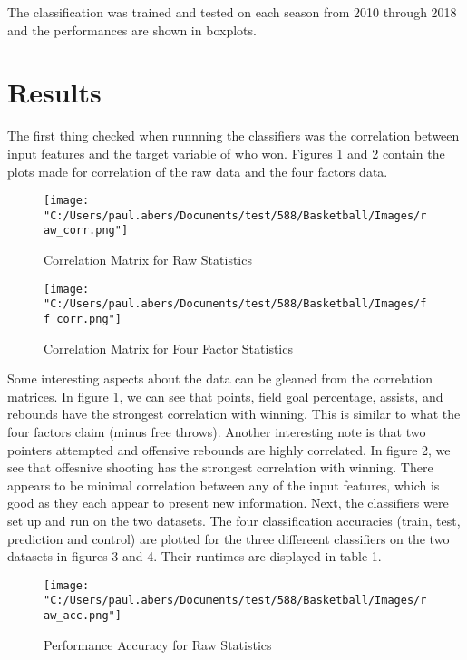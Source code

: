 \documentclass[12pt]{article}%
\begin{document}
\newline\newline
The classification was trained and tested on each season from 2010 through 2018 and the performances are shown in boxplots.
\section{Results}
The first thing checked when runnning the classifiers was the correlation between input features and the target variable of who won. Figures 1 and 2 contain the plots made for correlation of the raw data and the four factors data.


\begin{figure}[H]
\caption{Correlation Matrix for Raw Statistics}
\centering
\texttt{[image: "C:/Users/paul.abers/Documents/test/588/Basketball/Images/raw\_corr.png"]}
\end{figure}

\begin{figure}[H]
\caption{Correlation Matrix for Four Factor Statistics}
\centering
\texttt{[image: "C:/Users/paul.abers/Documents/test/588/Basketball/Images/ff\_corr.png"]}
\end{figure}

Some interesting aspects about the data can be gleaned from the correlation matrices. In figure 1, we can see that points, field goal percentage, assists, and rebounds have the strongest correlation with winning. This is similar to what the four factors claim (minus free throws). Another interesting note is that two pointers attempted and offensive rebounds are highly correlated. In figure 2, we see that offesnive shooting has the strongest correlation with winning. There appears to be minimal correlation between any of the input features, which is good as they each appear to present new information.
\newline\newline
Next, the classifiers were set up and run on the two datasets. The four classification accuracies (train, test, prediction and control) are plotted for the three differeent classifiers on the two datasets in figures 3 and 4. Their runtimes are displayed in table 1.

\begin{figure}[H]
\caption{Performance Accuracy for Raw Statistics}
\centering
\texttt{[image: "C:/Users/paul.abers/Documents/test/588/Basketball/Images/raw\_acc.png"]}
\end{figure}
\end{document}
